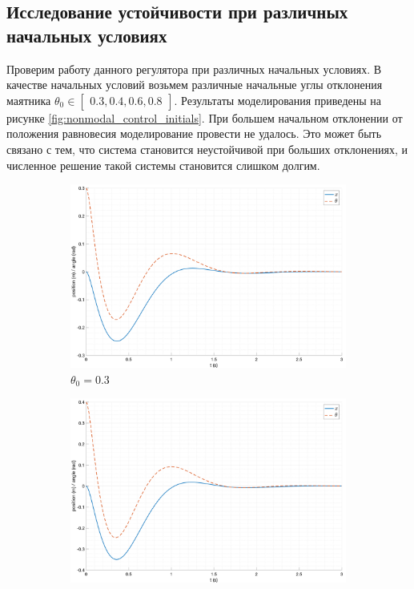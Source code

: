 \subsection{Исследование устойчивости при различных начальных условиях}
Проверим работу данного регулятора при различных начальных условиях. 
В качестве начальных условий возьмем различные начальные углы отклонения маятника $\theta_0 \in \begin{bmatrix}0.3, 0.4, 0.6, 0.8\end{bmatrix}$. Результаты 
моделирования приведены на рисунке \ref{fig:nonmodal_control_initials}. 
При большем начальном отклонении от положения равновесия моделирование провести не удалось. Это может быть связано с тем, 
что система становится неустойчивой при больших отклонениях, и численное решение такой системы становится слишком долгим. 
\begin{figure}[ht!]
    \centering
    \begin{subfigure}[b]{0.45\textwidth}
        \includegraphics[width=\textwidth]{media/plots/nonmodal_control/out_1.png}
        \caption{$\theta_0 = 0.3$}
    \end{subfigure}
    \begin{subfigure}[b]{0.45\textwidth}
        \includegraphics[width=\textwidth]{media/plots/nonmodal_control/out_2.png}

\end{subfigure}
\end{figure}
